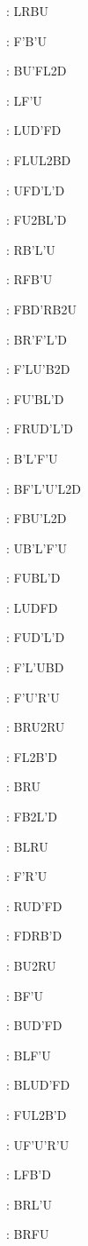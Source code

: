 \documentclass[9pt]{article}
\begin{document}
{\begin{multicols}{6}
: LRBU

: F'B'U

: BU'FL2D

: LF'U

: LUD'FD

: FLUL2BD

: UFD'L'D

: FU2BL'D

: RB'L'U

: RFB'U

: FBD'RB2U

: BR'F'L'D

: F'LU'B2D

: FU'BL'D

: FRUD'L'D

: B'L'F'U

: BF'L'U'L2D

: FBU'L2D

: UB'L'F'U

: FUBL'D

: LUDFD

: FUD'L'D

: F'L'UBD

: F'U'R'U

: BRU2RU

: FL2B'D

: BRU

: FB2L'D

: BLRU

: F'R'U

: RUD'FD

: FDRB'D

: BU2RU

: BF'U

: BUD'FD

: BLF'U

: BLUD'FD

: FUL2B'D

: UF'U'R'U

: LFB'D

: BRL'U

: BRFU


\end{multicols}}
\end{document}
